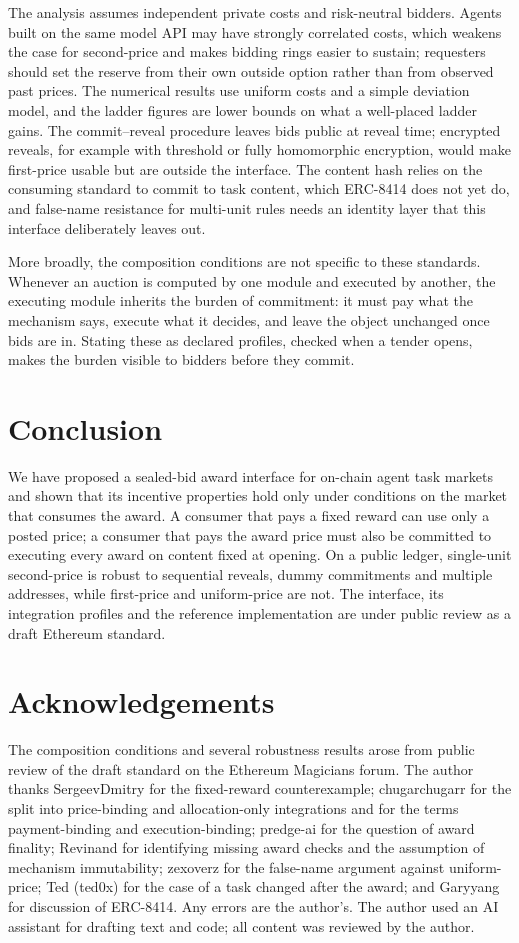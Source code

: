 \documentclass[11pt]{article}
\theoremstyle{definition}
\theoremstyle{remark}
\begin{document}
The analysis assumes independent private costs and risk-neutral bidders. Agents built on the same model API may have strongly correlated costs, which weakens the case for second-price and makes bidding rings easier to sustain; requesters should set the reserve from their own outside option rather than from observed past prices. The numerical results use uniform costs and a simple deviation model, and the ladder figures are lower bounds on what a well-placed ladder gains. The commit--reveal procedure leaves bids public at reveal time; encrypted reveals, for example with threshold or fully homomorphic encryption, would make first-price usable but are outside the interface. The content hash relies on the consuming standard to commit to task content, which ERC-8414 does not yet do, and false-name resistance for multi-unit rules needs an identity layer that this interface deliberately leaves out.

More broadly, the composition conditions are not specific to these standards. Whenever an auction is computed by one module and executed by another, the executing module inherits the burden of commitment: it must pay what the mechanism says, execute what it decides, and leave the object unchanged once bids are in. Stating these as declared profiles, checked when a tender opens, makes the burden visible to bidders before they commit.

\section{Conclusion}

We have proposed a sealed-bid award interface for on-chain agent task markets and shown that its incentive properties hold only under conditions on the market that consumes the award. A consumer that pays a fixed reward can use only a posted price; a consumer that pays the award price must also be committed to executing every award on content fixed at opening. On a public ledger, single-unit second-price is robust to sequential reveals, dummy commitments and multiple addresses, while first-price and uniform-price are not. The interface, its integration profiles and the reference implementation are under public review as a draft Ethereum standard.

\section*{Acknowledgements}

The composition conditions and several robustness results arose from public review of the draft standard on the Ethereum Magicians forum. The author thanks SergeevDmitry for the fixed-reward counterexample; chugarchugarr for the split into price-binding and allocation-only integrations and for the terms payment-binding and execution-binding; predge-ai for the question of award finality; Revinand for identifying missing award checks and the assumption of mechanism immutability; zexoverz for the false-name argument against uniform-price; Ted (ted0x) for the case of a task changed after the award; and Garyyang for discussion of ERC-8414. Any errors are the author's. The author used an AI assistant for drafting text and code; all content was reviewed by the author.
\end{document}
